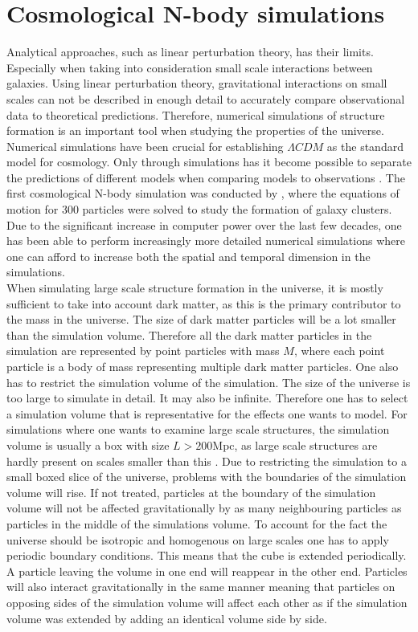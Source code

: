 \section{Cosmological N-body simulations}
Analytical approaches, such as linear perturbation theory, has their limits.
Especially when taking into consideration small scale interactions between
galaxies. Using linear perturbation theory, gravitational interactions on small scales can not be described in
enough detail to accurately compare observational data to theoretical
predictions. Therefore, numerical simulations of structure formation is an
important tool when studying the properties of the universe. Numerical
simulations have been crucial for establishing $\Lambda CDM$ as the standard
model for cosmology. Only through simulations has it become possible to separate
the predictions of different models when comparing models to observations
\cite[p.~361]{schneider2006extragalactic}. The first cosmological N-body
simulation was conducted by \cite{PeeblesPJE1970SotC}, where the equations of
motion for $300$ particles were solved to study the formation of galaxy clusters. Due to the significant increase in
computer power over the last few decades, one has been able to perform
increasingly more detailed numerical simulations where one can afford to
increase both the spatial and temporal dimension in the simulations.\\

When simulating large scale structure formation in the universe, it is mostly
sufficient to take into account dark matter, as this is the primary contributor
to the mass in the universe. The size of dark matter particles will be a lot smaller than the simulation volume. Therefore
all the dark matter particles in the simulation are represented by point
particles with mass $M$, where each point particle is a body of mass
representing multiple dark matter particles. One also has to restrict the
simulation volume of the simulation. The size of the universe is too large to
simulate in detail. It may also be infinite. Therefore one has to select a
simulation volume that is representative for the effects one wants to model. For
simulations where one wants to examine large scale structures, the simulation
volume is usually a box with size $L>200$Mpc, as large scale structures are hardly present on
scales smaller than this \cite[p.~362]{schneider2006extragalactic}. Due to
restricting the simulation to a small boxed slice of the universe, problems with
the boundaries of the simulation volume will rise. If not treated, particles at
the boundary of the simulation volume will not be affected gravitationally by as many
neighbouring particles as particles in the middle of the simulations volume. To
account for the fact the universe should be isotropic and homogenous on large
scales one has to apply periodic boundary conditions. This means that the cube
is extended periodically. A particle leaving the volume in one end will reappear
in the other end. Particles will also interact gravitationally in the same
manner meaning that particles on opposing sides of the simulation volume will
affect each other as if the simulation volume was extended by adding an
identical volume side by side.

